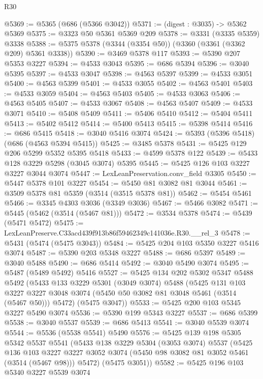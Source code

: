 \begin{lexlean}{R30}
\begin{coremodule}
@5369 := @5365 (@686 (@5366 @3042))
@5371 := (digest : @3035) -> @5362 @5369
@5375 := @3323 @50 @5361 @5369 @209
@5378 := @3331 (@3335 @5359) @3338
@5388 := @5375 @5378 (@3344 (@3354 @50)) (@3360 (@3361 (@3362 @209) @5361 @3338))
@5390 := @3469 @5378 @117
@5393 := @5390 @207 @5353 @3227
@5394 := @4533 @3043
@5395 := @686 @5394
@5396 := @3040 @5395
@5397 := @4533 @3047
@5398 := @4563 @5397
@5399 := @4533 @3051
@5400 := @4563 @5399
@5401 := @4533 @3055
@5402 := @4563 @5401
@5403 := @4533 @3059
@5404 := @4563 @5403
@5405 := @4533 @3063
@5406 := @4563 @5405
@5407 := @4533 @3067
@5408 := @4563 @5407
@5409 := @4533 @3071
@5410 := @5408 @5409
@5411 := @5406 @5410
@5412 := @5404 @5411
@5413 := @5402 @5412
@5414 := @5400 @5413
@5415 := @5398 @5414
@5416 := @686 @5415
@5418 := @3040 @5416 @3074
@5424 := @5393 (@5396 @5418) (@686 (@4563 @5394 @5415))
@5425 := @3485 @5378
@5431 := @5425 @129 @206 @5299 @5352 @5395 @5418
@5433 := @4599 @5378 @122
@5439 := @5433 @128 @3229 @5298 (@3045 @3074) @5395
@5445 := @5425 @126 @103 @3227 @3227 @3044 @3074
@5447 := LexLeanPreservation.conv_field @3305
@5450 := @5447 @5378 @101 @3227
@5454 := @5450 @81 @3082 @81 @3044
@5461 := @3509 @5378 @81 @5359 (@3514 (@3515 @5378 @81))
@5462 := @5454 @5461
@5466 := @3345 @4303 @3036 (@3349 @3036)
@5467 := @5466 @3082
@5471 := @5445 (@5462 (@3514 (@5467 @81)))
@5472 := @3534 @5378
@5474 := @5439 (@5471 @5472)
@5475 := LexLeanPreserve.C33acd439f913b86f59462349c141036e.R30.__rel_3
@5478 := @5431 (@5474 (@5475 @3043))
@5484 := @5425 @204 @103 @5350 @3227 @5416 @3074
@5487 := @5390 @203 @5348 @3227
@5488 := @686 @5397
@5489 := @3040 @5488
@5490 := @686 @5414
@5492 := @3040 @5490 @3074
@5495 := @5487 (@5489 @5492) @5416
@5527 := @5425
    @134
    @202
    @5302
    @5347
    @5488
    @5492
    (@5433
      @133
      @3229
      @5301
      (@3049 @3074)
      @5488
      (@5425
        @131
        @103
        @3227
        @3227
        @3048
        @3074
        (@5450 @50 @3082 @81 @3048 @5461 (@3514 (@5467 @50)))
        @5472)
      (@5475 @3047))
@5533 := @5425 @200 @103 @5345 @3227 @5490 @3074
@5536 := @5390 @199 @5343 @3227
@5537 := @686 @5399
@5538 := @3040 @5537
@5539 := @686 @5413
@5541 := @3040 @5539 @3074
@5544 := @5536 (@5538 @5541) @5490
@5576 := @5425
    @139
    @198
    @5305
    @5342
    @5537
    @5541
    (@5433
      @138
      @3229
      @5304
      (@3053 @3074)
      @5537
      (@5425
        @136
        @103
        @3227
        @3227
        @3052
        @3074
        (@5450 @98 @3082 @81 @3052 @5461 (@3514 (@5467 @98)))
        @5472)
      (@5475 @3051))
@5582 := @5425 @196 @103 @5340 @3227 @5539 @3074

\end{coremodule}
\end{lexlean}
